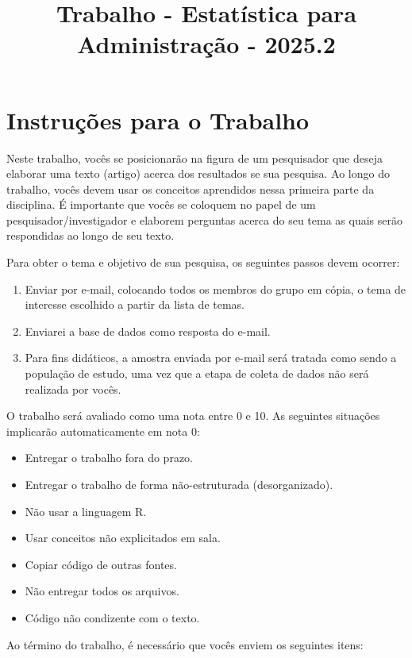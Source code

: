 \documentclass{article}
\title{Trabalho - Estatística para Administração - 2025.2}
\begin{document}
\date{}
\maketitle

\section{Instruções para o Trabalho}

Neste trabalho, vocês se posicionarão na figura de um pesquisador que deseja elaborar uma texto (artigo) acerca dos resultados se sua pesquisa.
Ao longo do trabalho, vocês devem usar os conceitos aprendidos nessa primeira parte da disciplina. É importante que vocês se coloquem 
no papel de um pesquisador/investigador e elaborem perguntas acerca do seu tema as quais serão respondidas ao longo de seu texto. 

Para obter o tema e objetivo de sua pesquisa, os seguintes passos devem ocorrer:
\begin{enumerate}
    \item Enviar por e-mail, colocando todos os membros do grupo em cópia, o tema de interesse escolhido a partir da lista de temas. 
    \item Enviarei a base de dados como resposta do e-mail. 
    \item Para fins didáticos, a amostra enviada por e-mail será tratada como sendo a população de estudo, uma vez que a etapa de coleta de dados não será realizada por vocês.
\end{enumerate}

O trabalho será avaliado como uma nota entre 0 e 10. As seguintes situações implicarão automaticamente em nota 0:

\begin{itemize}
    \item Entregar o trabalho fora do prazo. 
    \item Entregar o trabalho de forma não-estruturada (desorganizado). 
    \item Não usar a linguagem R.
    \item Usar conceitos não explicitados em sala. 
    \item Copiar código de outras fontes. 
    \item Não entregar todos os arquivos.
    \item Código não condizente com o texto. 
\end{itemize}

Ao término do trabalho, é necessário que vocês enviem os seguintes itens:
\end{document}
